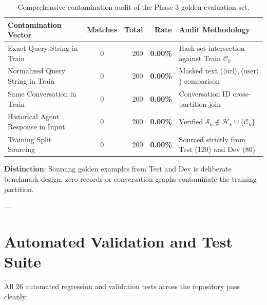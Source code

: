 \documentclass[11pt,a4paper]{article}
\begin{document}
\begin{table}[ht]
\centering
\small
\begin{tabularx}{\textwidth}{Xcrrl}
\toprule
\textbf{Contamination Vector} & \textbf{Matches} & \textbf{Total} & \textbf{Rate} & \textbf{Audit Methodology} \\
\midrule
Exact Query String in Train & 0 & 200 & \textbf{0.00\%} & Hash set intersection against Train $\mathcal{C}_k$ \\
Normalized Query String in Train & 0 & 200 & \textbf{0.00\%} & Masked text ($\langle\text{url}\rangle, \langle\text{user}\rangle$) comparison \\
Same Conversation in Train & 0 & 200 & \textbf{0.00\%} & Conversation ID cross-partition join \\
Historical Agent Response in Input & 0 & 200 & \textbf{0.00\%} & Verified $\mathcal{S}_k \notin \mathcal{H}_k \cup \{\mathcal{C}_k\}$ \\
Training Split Sourcing & 0 & 200 & \textbf{0.00\%} & Sourced strictly from Test (120) and Dev (80) \\
\bottomrule
\end{tabularx}
\caption{Comprehensive contamination audit of the Phase 3 golden evaluation set.}
\label{tab:contamination_audit}
\end{table}

\textbf{Distinction}: Sourcing golden examples from Test and Dev is deliberate benchmark design; zero records or conversation graphs contaminate the training partition.

---

\section{Automated Validation and Test Suite}

All 26 automated regression and validation tests across the repository pass cleanly:
\end{document}
